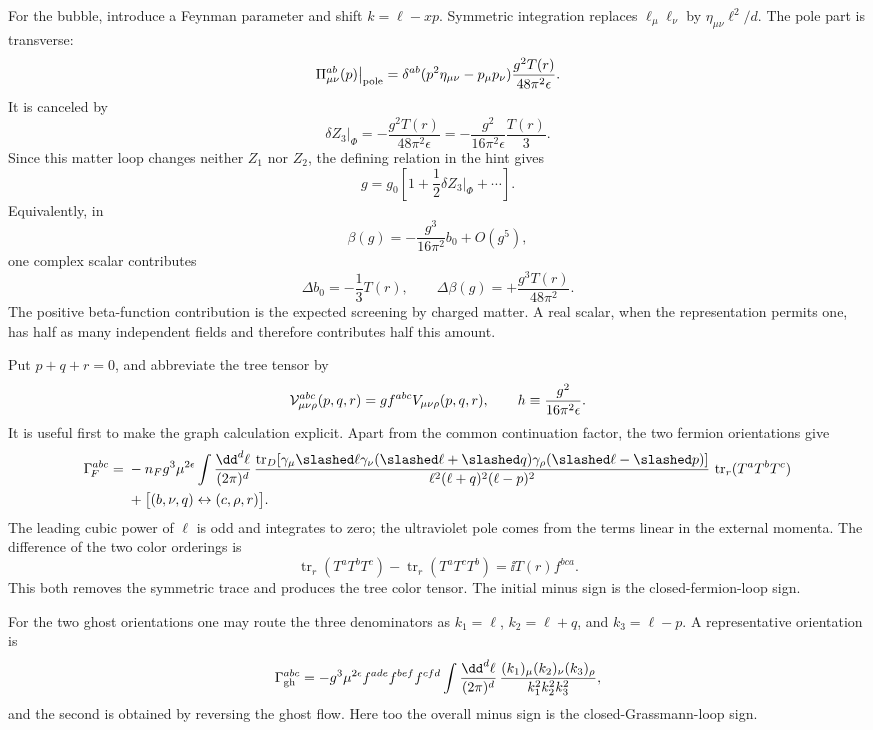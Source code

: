 \begin{enumerate}
  For the bubble, introduce a Feynman parameter and shift
  \(k=\ell-xp\).  Symmetric integration replaces
  \(\ell_\mu\ell_\nu\) by
  \(\eta_{\mu\nu}\ell^2/d\).  The pole part is transverse:
  \[
    \Pi_{\mu\nu}^{ab}(p)\big|_{\rm pole}
      =\delta^{ab}(p^2\eta_{\mu\nu}-p_\mu p_\nu)
        \frac{g^2T(r)}{48\pi^2\epsilon}.
  \]
  It is canceled by
  \[
    \boxed{\delta Z_3\big|_\Phi
      =-\frac{g^2T(r)}{48\pi^2\epsilon}
      =-\frac{g^2}{16\pi^2\epsilon}\frac{T(r)}3.}
  \]
  Since this matter loop changes neither \(Z_1\) nor \(Z_2\), the defining
  relation in the hint gives
  \[
    g=g_0\left[1+\frac12\delta Z_3\big|_\Phi+\cdots\right].
  \]
  Equivalently, in
  \[
    \beta(g)=-\frac{g^3}{16\pi^2}b_0+O(g^5),
  \]
  one complex scalar contributes
  \[
    \boxed{\Delta b_0=-\frac13T(r),\qquad
      \Delta\beta(g)=+\frac{g^3T(r)}{48\pi^2}.}
  \]
  The positive beta-function contribution is the expected screening by
  charged matter.  A real scalar, when the representation permits one,
  has half as many independent fields and therefore contributes half this
  amount.

  Put \(p+q+r=0\), and abbreviate the tree tensor by
  \[
    {\cal V}_{\mu\nu\rho}^{abc}(p,q,r)
      =g f^{abc}V_{\mu\nu\rho}(p,q,r),\qquad
    h\equiv\frac{g^2}{16\pi^2\epsilon}.
  \]
  It is useful first to make the graph calculation explicit.  Apart from
  the common continuation factor, the two fermion orientations give
  \[
  \begin{split}
    \Gamma_{\!F}^{abc}={}&-n_Fg^3\mu^{2\epsilon}
      \int\frac{\dd^d\ell}{(2\pi)^d}\,
      \frac{\operatorname{tr}_{D}\!\left[
        \gamma_\mu\slashed\ell\gamma_\nu(\slashed\ell+\slashed q)
        \gamma_\rho(\slashed\ell-\slashed p)\right]}
      {\ell^2(\ell+q)^2(\ell-p)^2}\,
      \operatorname{tr}_r(T^aT^bT^c)\\
    &+\bigl[(b,\nu,q)\leftrightarrow(c,\rho,r)\bigr].
  \end{split}
  \]
  The leading cubic power of \(\ell\) is odd and integrates to zero; the
  ultraviolet pole comes from the terms linear in the external momenta.
  The difference of the two color orderings is
  \[
    \operatorname{tr}_r(T^aT^bT^c)
      -\operatorname{tr}_r(T^aT^cT^b)
      =\ii T(r)f^{bca}.
  \]
  This both removes the symmetric trace and produces the tree color
  tensor.  The initial minus sign is the closed-fermion-loop sign.

  For the two ghost orientations one may route the three denominators as
  \(k_1=\ell\), \(k_2=\ell+q\), and \(k_3=\ell-p\).  A representative
  orientation is
  \[
    \Gamma_{\rm gh}^{abc}
      =-g^3\mu^{2\epsilon}
       f^{ade}f^{bef}f^{cfd}
       \int\frac{\dd^d\ell}{(2\pi)^d}\,
       \frac{(k_1)_\mu(k_2)_\nu(k_3)_\rho}
            {k_1^2k_2^2k_3^2},
  \]
  and the second is obtained by reversing the ghost flow.  Here too the
  overall minus sign is the closed-Grassmann-loop sign.


\end{enumerate}
